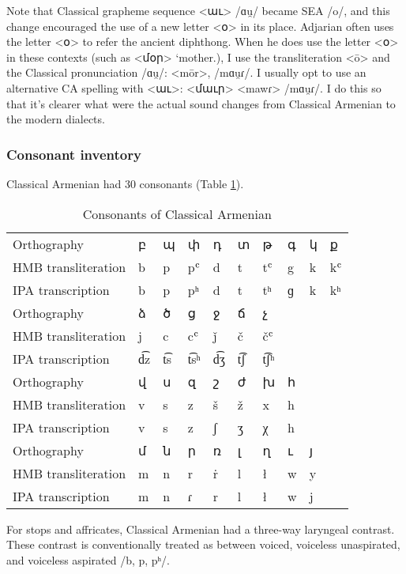 Note that Classical grapheme sequence <աւ> /ɑu̯/ became SEA /o/, and this change encouraged the use of a new letter <օ> in its place. Adjarian often uses the letter <օ> to refer the ancient diphthong. When he does use the letter <օ> in these contexts (such as <մօր> `mother.{\gen}), I use the transliteration <ō> and the Classical pronunciation /ɑu̯/: <mōr>, /mɑu̯ɾ/. I usually opt to use an alternative CA spelling with <աւ>: <մաւր> <mawɾ> /mɑu̯ɾ/. I do this so that it's clearer what were the actual sound changes from Classical Armenian to the modern dialects. 


\subsubsection{Consonant inventory}\label{sec:HossepIntro:phonotransc:CA:cons}



Classical Armenian had 30 consonants (Table \ref{tab:HossepIntr:classicalConsonant}). 

\begin{table}[H]
	\centering
	\caption{Consonants of Classical Armenian}
	\label{tab:HossepIntr:classicalConsonant}
	\begin{tabular}{|l|lllllllll|}
		\hline 
		Orthography & բ &պ& փ &դ& տ &թ& գ& կ& ք \\
		HMB transliteration & b &p& pʿ &d& t &tʿ& g& k& kʿ \\
		IPA transcription & b &p& pʰ &d& t &tʰ& ɡ& k& kʰ \\
		\hline 
		Orthography &ձ& ծ& ց &ջ& ճ& չ & & & \\
		HMB transliteration &j &c &cʿ& ǰ &č &čʿ & & & \\
		IPA transcription & d͡z & t͡s & t͡sʰ & d͡ʒ & t͡ʃ & t͡ʃʰ & & & \\
		\hline 
		Orthography & վ & ս& զ& շ& ժ& խ & հ & & \\
		HMB transliteration & v & s& z& š& ž& x & h & & \\
		IPA transcription& v & s& z& ʃ& ʒ& χ & h & & 
		\\ 
		\hline
		Orthography & մ & ն & ր& ռ& լ& ղ & ւ & յ & \\
		HMB transliteration & m & n & r & ṙ&l & ł & w & y & \\
		IPA transcription & m & n & ɾ & r& l & ł & w & j& 
		\\ \hline 
	\end{tabular}
\end{table}

For stops and affricates, Classical Armenian had a three-way laryngeal contrast. These contrast is conventionally treated as between voiced, voiceless unaspirated, and voiceless aspirated /b, p, pʰ/. 

